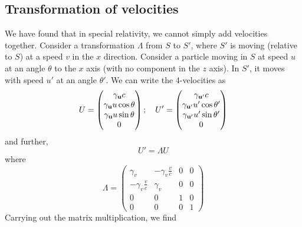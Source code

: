 \subsection{Transformation of velocities}
We have found that in special relativity, we cannot simply add velocities together.
Consider a transformation \(\Lambda\) from \(S\) to \(S'\), where \(S'\) is moving (relative to \(S\)) at a speed \(v\) in the \(x\) direction.
Consider a particle moving in \(S\) at speed \(u\) at an angle \(\theta\) to the \(x\) axis (with no component in the \(z\) axis).
In \(S'\), it moves with speed \(u'\) at an angle \(\theta'\).
We can write the 4-velocities as
\[
	U = \begin{pmatrix}
		\gamma_{\vb u}c           \\
		\gamma_{\vb u}u\cos\theta \\
		\gamma_{\vb u}u\sin\theta \\
		0
	\end{pmatrix};\quad U' = \begin{pmatrix}
		\gamma_{\vb u'}c             \\
		\gamma_{\vb u'}u'\cos\theta' \\
		\gamma_{\vb u'}u'\sin\theta' \\
		0
	\end{pmatrix}
\]
and further,
\[
	U' = \Lambda U
\]
where
\[
	\Lambda = \begin{pmatrix}
		\gamma_v              & -\gamma_v \frac{v}{c} & 0 & 0 \\
		-\gamma_v \frac{v}{c} & \gamma_v              & 0 & 0 \\
		0                     & 0                     & 1 & 0 \\
		0                     & 0                     & 0 & 1
	\end{pmatrix}
\]
Carrying out the matrix multiplication, we find
